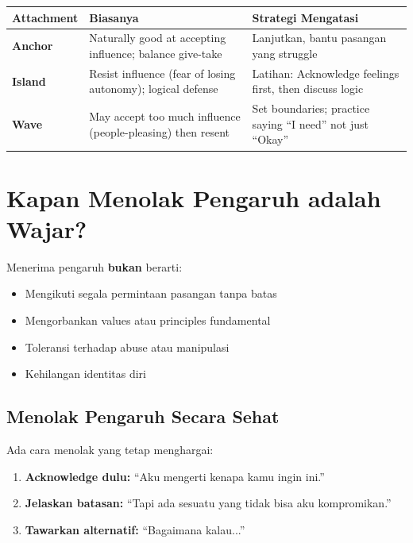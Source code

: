 \begin{center}
\renewcommand{\arraystretch}{1.5}
\begin{tabular}{|>{\raggedright}p{2.5cm}|>{\raggedright}p{5cm}|>{\raggedright\arraybackslash}p{5.5cm}|}
\hline
\rowcolor{primary!20}
\textbf{Attachment} & \textbf{Biasanya} & \textbf{Strategi Mengatasi} \\
\hline
\textbf{Anchor} & Naturally good at accepting influence; balance give-take & Lanjutkan, bantu pasangan yang struggle \\
\hline
\textbf{Island} & Resist influence (fear of losing autonomy); logical defense & Latihan: Acknowledge feelings first, then discuss logic \\
\hline
\textbf{Wave} & May accept too much influence (people-pleasing) then resent & Set boundaries; practice saying ``I need'' not just ``Okay'' \\
\hline
\end{tabular}
\end{center}

\section{Kapan Menolak Pengaruh adalah Wajar?}

\begin{warningbox}
Menerima pengaruh \textbf{bukan} berarti:
\begin{itemize}
    \item Mengikuti segala permintaan pasangan tanpa batas
    \item Mengorbankan values atau principles fundamental
    \item Toleransi terhadap abuse atau manipulasi
    \item Kehilangan identitas diri
\end{itemize}
\end{warningbox}

\subsection{Menolak Pengaruh Secara Sehat}

Ada cara menolak yang tetap menghargai:
\begin{enumerate}[leftmargin=*]
    \item \textbf{Acknowledge dulu:} ``Aku mengerti kenapa kamu ingin ini.''
    \item \textbf{Jelaskan batasan:} ``Tapi ada sesuatu yang tidak bisa aku kompromikan.''
    \item \textbf{Tawarkan alternatif:} ``Bagaimana kalau...''
\end{enumerate}

